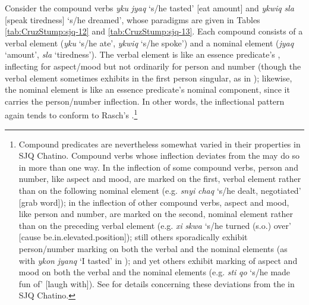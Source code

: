 \documentclass[output=paper]{langsci/langscibook}
\begin{document}
Consider the compound verbs \emph{yku} \emph{jyaq} `s/he tasted' [eat amount] and \emph{ykwiq}  \emph{sla} [speak tiredness] `s/he dreamed', whose paradigms are given in Tables \ref{tab:CruzStump:sjq-12} and \ref{tab:CruzStump:sjq-13}.  Each compound consists of a verbal element (\emph{yku} `s/he ate', \emph{ykwiq} `s/he spoke') and a nominal element (\emph{jyaq}  `amount', \emph{sla} `tiredness').  The verbal element is like an essence predicate's , inflecting for aspect/mood but not ordinarily for person and number (though the verbal element sometimes exhibits  in the first person singular, as in ); likewise, the nominal element is like an essence predicate's nominal component, since it carries the person/number inflection. In other words, the inflectional pattern again tends to conform to Rasch's .\footnote{Compound predicates are nevertheless somewhat varied in their properties in SJQ Chatino.  Compound verbs whose inflection deviates from the  may do so in more than one way.
 In the inflection of some compound verbs, person and number, like aspect and mood, are marked on the first, verbal element rather than on the following nominal element (e.g. \emph{snyi} \emph{chaq} `s/he dealt, negotiated' [grab word]); in the inflection of other compound verbs, aspect and mood, like person and number, are marked on the second, nominal element rather than on the preceding verbal element (e.g. \emph{xi} \emph{skwa} `s/he turned (s.o.) over' [cause be.in.elevated.position]); still others sporadically exhibit person/number marking on both the verbal and the nominal elements (as with \emph{ykon} \emph{jyanq} `I tasted' in ); and yet others exhibit marking of aspect and mood on both the verbal and the nominal elements (e.g. \emph{sti} \emph{qo} `s/he made fun of' [laugh with]). See \cite{CruzWoodbury2013} for details concerning these deviations from the  in SJQ Chatino.}
\end{document}
